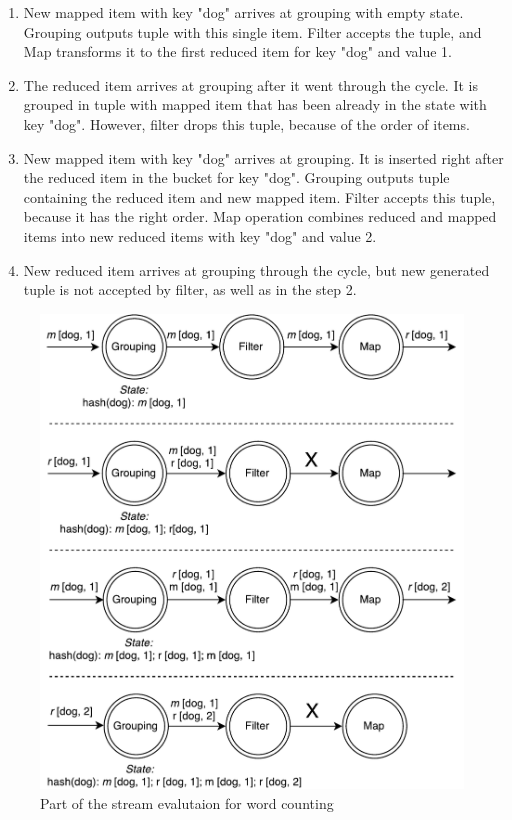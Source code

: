 \begin{enumerate}
    \item New mapped item with key "dog" arrives at grouping with empty state. Grouping outputs tuple with this single item. Filter accepts the tuple, and Map transforms it to the first reduced item for key "dog" and value 1.
    \item The reduced item arrives at grouping after it went through the cycle. It is grouped in tuple with mapped item that has been already in the state with key "dog". However, filter drops this tuple, because of the order of items.
    \item New mapped item with key "dog" arrives at grouping. It is inserted right after the reduced item in the bucket for key "dog". Grouping outputs tuple containing the reduced item and new mapped item. Filter accepts this tuple, because it has the right order. Map operation combines reduced and mapped items into new reduced items with key "dog" and value 2.
    \item New reduced item arrives at grouping through the cycle, but new generated tuple is not accepted by filter, as well as in the step 2.
\end{enumerate}

\begin{figure}[htb]
  \centering
  \includegraphics[scale=0.5]{pics/wordcount}
  \caption{Part of the stream evalutaion for word counting}
  \label {word-count-figure}
\end{figure}

